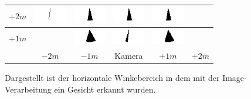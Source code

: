 \begin{figure}
\begin{tabular}{|c|c|c|c|c|c|}
		\hline 
		$+2m$ & \includegraphics[width=1.4cm]{PositionWinkel/Winkel_-200_200.png} &
		\includegraphics[width=1.4cm]{PositionWinkel/Winkel_-100_200.png} &
		\includegraphics[width=1.4cm]{PositionWinkel/Winkel_0_200.png} &
		\includegraphics[width=1.4cm]{PositionWinkel/Winkel_100_200.png} & \\ 
		\hline 
		$+1m$ & &
		\includegraphics[width=1.4cm]{PositionWinkel/Winkel_-100_100.png} &
		\includegraphics[width=1.4cm]{PositionWinkel/Winkel_0_100.png} &
		\includegraphics[width=1.4cm]{PositionWinkel/Winkel_100_100.png} & \\ 
		\hline 
		& $-2m$ & $-1m$ &Kamera& $+1m$ & $+2m$ \\ 
		\hline 
	\end{tabular}
	\caption{Dargestellt ist der horizontale Winkebereich in dem mit der Image-Verarbeitung ein Gesicht erkannt wurden.}
	\label{graph_Test_Bilder}
\end{figure}
